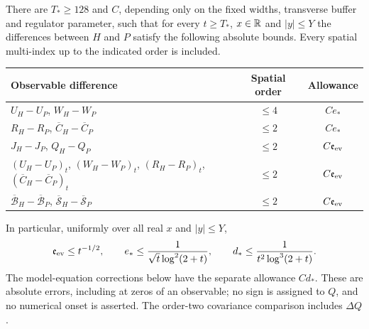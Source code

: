 \begin{theorem}
\label{thm:positive-evolution}
There are $T_*\ge128$ and $C$, depending only on the fixed widths,
transverse buffer and regulator parameter, such that for every
$t\ge T_*$, $x\in\mathbb R$ and $|y|\le Y$ the differences between $H$
and $P$ satisfy the following absolute bounds. Every spatial
multi-index up to the indicated order is included.
\begin{center}
\begin{tabular}{@{}p{}cc@{}}
\toprule
Observable difference & Spatial order & Allowance\\
\midrule
$U_H-U_P$, $W_H-W_P$ & $\le4$ & $Ce_*$\\
$R_H-R_P$, $\overline C_H-\overline C_P$ & $\le2$ & $Ce_*$\\
$J_H-J_P$, $Q_H-Q_P$
 & $\le2$ & $C\mathfrak e_{\rm ev}$\\
$(U_H-U_P)_t$, $(W_H-W_P)_t$, $(R_H-R_P)_t$,
 $(\overline C_H-\overline C_P)_t$
 & $\le2$ & $C\mathfrak e_{\rm ev}$\\
$\overline{\mathcal B}_H-\overline{\mathcal B}_P$,
 $\overline{\mathcal S}_H-\overline{\mathcal S}_P$
 & $\le2$ & $C\mathfrak e_{\rm ev}$\\
\bottomrule
\end{tabular}
\end{center}
In particular, uniformly over all real $x$ and $|y|\le Y$,
\begin{equation}
 \mathfrak e_{\rm ev}\le t^{-1/2},\qquad
 e_*\le\frac1{\sqrt t\log^2(2+t)},\qquad
 d_*\le\frac1{t^2\log^3(2+t)}.
 \label{eq:positive-evolution-uniform}
\end{equation}
The model-equation corrections below have the separate allowance
$Cd_*$. These are absolute errors, including at zeros of an
observable; no sign is assigned to $Q$, and no numerical onset is
asserted. The order-two covariance comparison includes $\Delta Q$.
\end{theorem}

